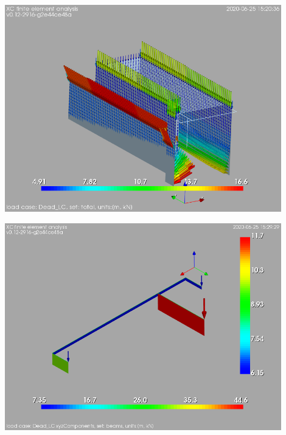 \begin{Figure}
    \centering
    \includegraphics[width=120mm]{ramp_wall/figures/dead_load_over_ramp_wall}
    \label{rw_D}
\end{Figure}

\begin{Figure}
    \centering
    \includegraphics[width=120mm]{ramp_wall/figures/dead_load_over_steel_beams}
\end{Figure}

